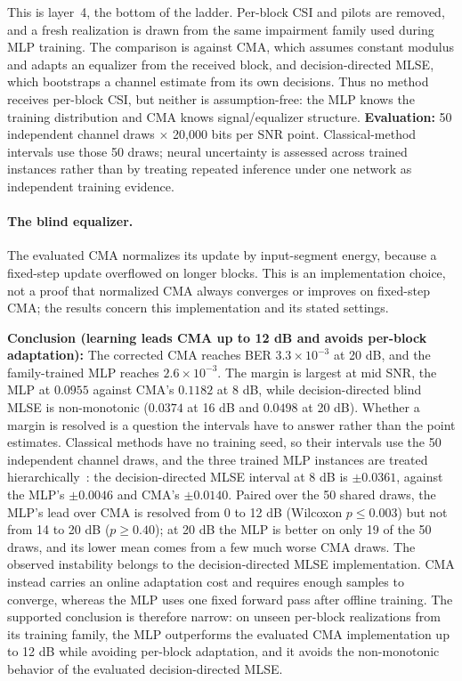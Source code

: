 This is layer~4, the bottom of the ladder. Per-block CSI and pilots are removed, and a fresh realization is drawn from the same impairment family used during MLP training. The comparison is against CMA, which assumes constant modulus and adapts an equalizer from the received block, and decision-directed MLSE, which bootstraps a channel estimate from its own decisions. Thus no method receives per-block CSI, but neither is assumption-free: the MLP knows the training distribution and CMA knows signal/equalizer structure. \textbf{Evaluation:} 50 independent channel draws $\times$ 20{,}000 bits per SNR point. Classical-method intervals use those 50 draws; neural uncertainty is assessed across trained instances rather than by treating repeated inference under one network as independent training evidence.

\paragraph{The blind equalizer.} The evaluated CMA normalizes its update by input-segment energy, because a fixed-step update overflowed on longer blocks. This is an implementation choice, not a proof that normalized CMA always converges or improves on fixed-step CMA; the results concern this implementation and its stated settings.

\textbf{Conclusion (learning leads CMA up to 12 dB and avoids per-block adaptation):} The corrected CMA reaches BER $3.3\times10^{-3}$ at 20 dB, and the family-trained MLP reaches $2.6\times10^{-3}$. The margin is largest at mid SNR, the MLP at $0.0955$ against CMA's $0.1182$ at 8 dB, while decision-directed blind MLSE is non-monotonic ($0.0374$ at 16 dB and $0.0498$ at 20 dB). Whether a margin is resolved is a question the intervals have to answer rather than the point estimates. Classical methods have no training seed, so their intervals use the 50 independent channel draws, and the three trained MLP instances are treated hierarchically~: the decision-directed MLSE interval at 8 dB is $\pm0.0361$, against the MLP's $\pm0.0046$ and CMA's $\pm0.0140$. Paired over the 50 shared draws, the MLP's lead over CMA is resolved from 0 to 12 dB (Wilcoxon $p \le 0.003$) but not from 14 to 20 dB ($p \ge 0.40$); at 20 dB the MLP is better on only 19 of the 50 draws, and its lower mean comes from a few much worse CMA draws. The observed instability belongs to the decision-directed MLSE implementation. CMA instead carries an online adaptation cost and requires enough samples to converge, whereas the MLP uses one fixed forward pass after offline training. The supported conclusion is therefore narrow: on unseen per-block realizations from its training family, the MLP outperforms the evaluated CMA implementation up to 12 dB while avoiding per-block adaptation, and it avoids the non-monotonic behavior of the evaluated decision-directed MLSE.

